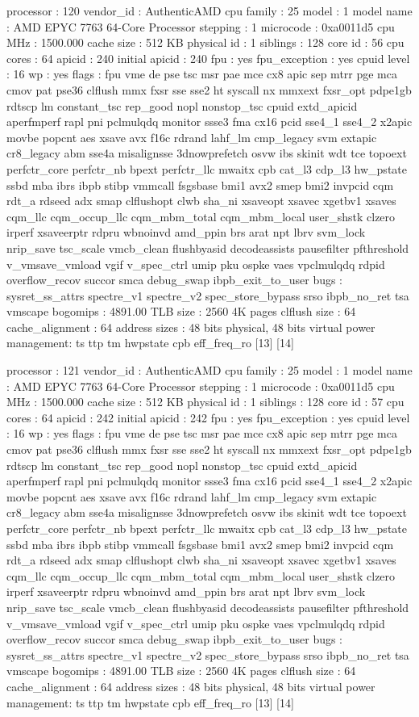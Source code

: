 processor	: 120
vendor_id	: AuthenticAMD
cpu family	: 25
model		: 1
model name	: AMD EPYC 7763 64-Core Processor
stepping	: 1
microcode	: 0xa0011d5
cpu MHz		: 1500.000
cache size	: 512 KB
physical id	: 1
siblings	: 128
core id		: 56
cpu cores	: 64
apicid		: 240
initial apicid	: 240
fpu		: yes
fpu_exception	: yes
cpuid level	: 16
wp		: yes
flags		: fpu vme de pse tsc msr pae mce cx8 apic sep mtrr pge mca cmov pat pse36 clflush mmx fxsr sse sse2 ht syscall nx mmxext fxsr_opt pdpe1gb rdtscp lm constant_tsc rep_good nopl nonstop_tsc cpuid extd_apicid aperfmperf rapl pni pclmulqdq monitor ssse3 fma cx16 pcid sse4_1 sse4_2 x2apic movbe popcnt aes xsave avx f16c rdrand lahf_lm cmp_legacy svm extapic cr8_legacy abm sse4a misalignsse 3dnowprefetch osvw ibs skinit wdt tce topoext perfctr_core perfctr_nb bpext perfctr_llc mwaitx cpb cat_l3 cdp_l3 hw_pstate ssbd mba ibrs ibpb stibp vmmcall fsgsbase bmi1 avx2 smep bmi2 invpcid cqm rdt_a rdseed adx smap clflushopt clwb sha_ni xsaveopt xsavec xgetbv1 xsaves cqm_llc cqm_occup_llc cqm_mbm_total cqm_mbm_local user_shstk clzero irperf xsaveerptr rdpru wbnoinvd amd_ppin brs arat npt lbrv svm_lock nrip_save tsc_scale vmcb_clean flushbyasid decodeassists pausefilter pfthreshold v_vmsave_vmload vgif v_spec_ctrl umip pku ospke vaes vpclmulqdq rdpid overflow_recov succor smca debug_swap ibpb_exit_to_user
bugs		: sysret_ss_attrs spectre_v1 spectre_v2 spec_store_bypass srso ibpb_no_ret tsa vmscape
bogomips	: 4891.00
TLB size	: 2560 4K pages
clflush size	: 64
cache_alignment	: 64
address sizes	: 48 bits physical, 48 bits virtual
power management: ts ttp tm hwpstate cpb eff_freq_ro [13] [14]

processor	: 121
vendor_id	: AuthenticAMD
cpu family	: 25
model		: 1
model name	: AMD EPYC 7763 64-Core Processor
stepping	: 1
microcode	: 0xa0011d5
cpu MHz		: 1500.000
cache size	: 512 KB
physical id	: 1
siblings	: 128
core id		: 57
cpu cores	: 64
apicid		: 242
initial apicid	: 242
fpu		: yes
fpu_exception	: yes
cpuid level	: 16
wp		: yes
flags		: fpu vme de pse tsc msr pae mce cx8 apic sep mtrr pge mca cmov pat pse36 clflush mmx fxsr sse sse2 ht syscall nx mmxext fxsr_opt pdpe1gb rdtscp lm constant_tsc rep_good nopl nonstop_tsc cpuid extd_apicid aperfmperf rapl pni pclmulqdq monitor ssse3 fma cx16 pcid sse4_1 sse4_2 x2apic movbe popcnt aes xsave avx f16c rdrand lahf_lm cmp_legacy svm extapic cr8_legacy abm sse4a misalignsse 3dnowprefetch osvw ibs skinit wdt tce topoext perfctr_core perfctr_nb bpext perfctr_llc mwaitx cpb cat_l3 cdp_l3 hw_pstate ssbd mba ibrs ibpb stibp vmmcall fsgsbase bmi1 avx2 smep bmi2 invpcid cqm rdt_a rdseed adx smap clflushopt clwb sha_ni xsaveopt xsavec xgetbv1 xsaves cqm_llc cqm_occup_llc cqm_mbm_total cqm_mbm_local user_shstk clzero irperf xsaveerptr rdpru wbnoinvd amd_ppin brs arat npt lbrv svm_lock nrip_save tsc_scale vmcb_clean flushbyasid decodeassists pausefilter pfthreshold v_vmsave_vmload vgif v_spec_ctrl umip pku ospke vaes vpclmulqdq rdpid overflow_recov succor smca debug_swap ibpb_exit_to_user
bugs		: sysret_ss_attrs spectre_v1 spectre_v2 spec_store_bypass srso ibpb_no_ret tsa vmscape
bogomips	: 4891.00
TLB size	: 2560 4K pages
clflush size	: 64
cache_alignment	: 64
address sizes	: 48 bits physical, 48 bits virtual
power management: ts ttp tm hwpstate cpb eff_freq_ro [13] [14]

